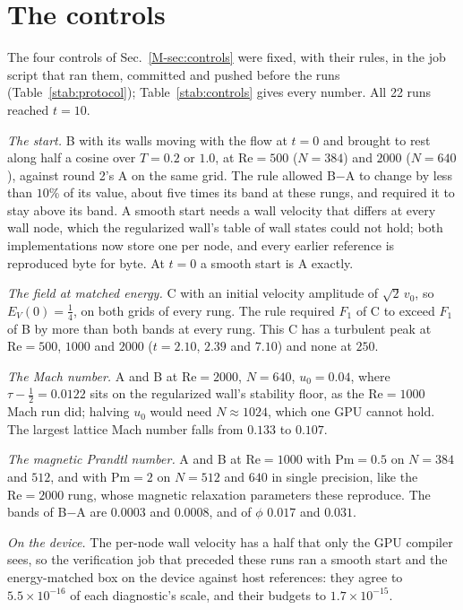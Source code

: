 \documentclass[aip,pop,reprint,amsmath,amssymb,superscriptaddress,floatfix]{revtex4-2}
\newcommand{\Rey}{\mathrm{Re}}
\begin{document}
\section{The controls}
\label{s:controls}

The four controls of Sec.~\ref{M-sec:controls} were fixed, with their rules, in the
job script that ran them, committed and pushed before the runs
(Table~\ref{stab:protocol}); Table~\ref{stab:controls} gives every number. All 22
runs reached $t=10$.

\emph{The start.} B with its walls moving with the flow at $t=0$ and brought to rest
along half a cosine over $T=0.2$ or $1.0$, at $\Rey=500$ ($N=384$) and $2000$
($N=640$), against round 2's A on the same grid. The rule allowed B$-$A to change by
less than $10$\% of its value, about five times its band at these rungs, and required
it to stay above its band. A smooth start needs a wall velocity that differs at
every wall node, which the regularized wall's table of wall states could not hold;
both implementations now store one per node, and every earlier reference is
reproduced byte for byte. At $t=0$ a smooth start is A exactly.

\emph{The field at matched energy.} C with an initial velocity amplitude of
$\sqrt2\,v_0$, so $E_V(0)=\frac14$, on both grids of every rung. The rule required
$F_1$ of C to exceed $F_1$ of B by more than both bands at every rung. This C has a
turbulent peak at $\Rey=500$, $1000$ and $2000$ ($t=2.10$, $2.39$ and $7.10$) and none
at $250$.

\emph{The Mach number.} A and B at $\Rey=2000$, $N=640$, $u_0=0.04$, where
$\tau-\frac12=0.0122$ sits on the regularized wall's stability floor, as the
$\Rey=1000$ Mach run did; halving $u_0$ would need $N\approx1024$, which one GPU
cannot hold. The largest lattice Mach number falls from $0.133$ to $0.107$.

\emph{The magnetic Prandtl number.} A and B at $\Rey=1000$ with $\mathrm{Pm}=0.5$ on
$N=384$ and $512$, and with $\mathrm{Pm}=2$ on $N=512$ and $640$ in single precision,
like the $\Rey=2000$ rung, whose magnetic relaxation parameters these reproduce. The
bands of B$-$A are $0.0003$ and $0.0008$, and of $\phi$ $0.017$ and $0.031$.

\emph{On the device.} The per-node wall velocity has a half that only the GPU
compiler sees, so the verification job that preceded these runs ran a smooth start
and the energy-matched box on the device against host references: they agree to
$5.5\times10^{-16}$ of each diagnostic's scale, and their budgets to
$1.7\times10^{-15}$.
\end{document}
